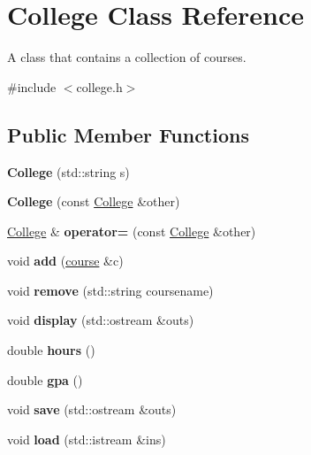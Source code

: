 \hypertarget{classCollege}{}\section{College Class Reference}
\label{classCollege}


A class that contains a collection of courses.  




{\ttfamily \#include $<$college.\+h$>$}

\subsection*{Public Member Functions}
\begin{DoxyCompactItemize}
\item 
\mbox{\label{classCollege_adabaf4087355e83f9f7d39f1e1498b41}} 
{\bfseries College} (std\+::string s)
\item 
\mbox{\label{classCollege_ad007ad488e5a7ef986114080d0c8e101}} 
{\bfseries College} (const \hyperlink{classCollege}{College} \&other)
\item 
\mbox{\label{classCollege_af2194c9b37f80d13dc3fdba6784b18e8}} 
\hyperlink{classCollege}{College} \& {\bfseries operator=} (const \hyperlink{classCollege}{College} \&other)
\item 
\mbox{\label{classCollege_a67fd1d8970b46b24ce2e0dd72598a22f}} 
void {\bfseries add} (\hyperlink{classcourse}{course} \&c)
\item 
\mbox{\label{classCollege_a4d2ae513b36e6421fb1ca2c08459cfe6}} 
void {\bfseries remove} (std\+::string coursename)
\item 
\mbox{\label{classCollege_a52ca0a164483cf5c05591cd0fb8b300c}} 
void {\bfseries display} (std\+::ostream \&outs)
\item 
\mbox{\label{classCollege_a8a7a762611a1d7e00c453390d49355fd}} 
double {\bfseries hours} ()
\item 
\mbox{\label{classCollege_aaf9bfaa0bc717e96da6365661a96fcd0}} 
double {\bfseries gpa} ()
\item 
\mbox{\label{classCollege_af6b419f813bc990c0e11f99b78a26899}} 
void {\bfseries save} (std\+::ostream \&outs)
\item 
\mbox{\label{classCollege_a11422094ddd907705daede7aa537dd73}} 
void {\bfseries load} (std\+::istream \&ins)
\end{DoxyCompactItemize}


